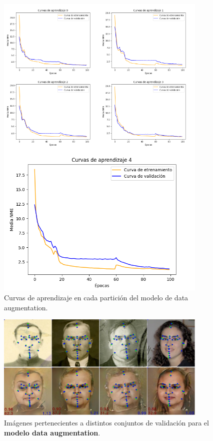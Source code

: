         \begin{figure}[H]
            \centering
            \includegraphics[width=0.9\textwidth]{img/curvas_daugmentation.png}
            \caption{Curvas de aprendizaje en cada partición del modelo de data augmentation.}
            \label{fig:curvas_daugmentation}
        \end{figure}

        \begin{figure}[H]
            \centering
            \includegraphics[width=0.9\textwidth]{img/image_daug.png}
            \caption{Imágenes pertenecientes a distintos conjuntos de validación para el \textbf{modelo data augmentation}.}
            \label{fig:Ejemplo_daug}
        \end{figure}

